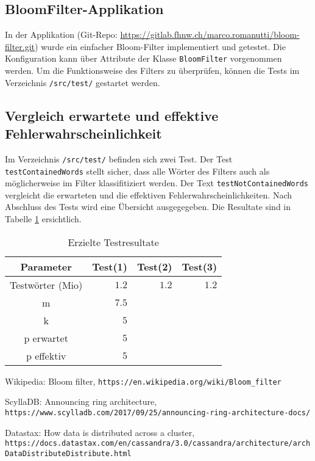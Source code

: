 \documentclass[10pt, a4paper, twocolumn]{article} %
\begin{document}
\subsection{BloomFilter-Applikation}

In der Applikation (Git-Repo: \url{https://gitlab.fhnw.ch/marco.romanutti/bloom-filter.git}) wurde ein einfacher Bloom-Filter implementiert und getestet.
Die Konfiguration kann über Attribute der Klasse \texttt{BloomFilter} vorgenommen werden.
Um die Funktionsweise des Filters zu überprüfen, können die Tests im Verzeichnis \texttt{/src/test/} gestartet werden.

\subsection{Vergleich erwartete und effektive Fehlerwahrscheinlichkeit}

Im Verzeichnis \texttt{/src/test/} befinden sich zwei Test.
Der Test \texttt{testContainedWords} stellt sicher, dass alle Wörter des Filters auch als möglicherweise im Filter klassifitiziert werden.
Der Text \texttt{testNotContainedWords} vergleicht die erwarteten und die effektiven Fehlerwahrscheinlichkeiten.
Nach Abschluss des Tests wird eine Übersicht ausgegegeben.
Die Resultate sind in Tabelle \ref{tests} ersichtlich.

\begin{table}[h]
	\caption{Erzielte Testresultate}
	\label{tests}
	\centering
	\begin{tabular}{crrr}
		\toprule
		\cmidrule(r){1-2}
		Parameter & Test(1) & Test(2) & Test(3) \\
		\midrule
		Testwörter (Mio) & $1.2$ & $1.2$ & $1.2$ \\
		m & $7.5$ & \\
		k & $5$ & \\
		p erwartet & $5$ & \\
		p effektiv & $5$ & \\
		\bottomrule
	\end{tabular}
\end{table}


\begin{thebibliography}{9}
	Wikipedia: Bloom filter,
	\texttt{https://en.wikipedia.org/wiki/Bloom\_filter}

	ScyllaDB: Announcing ring architecture,
	\texttt{https://www.scylladb.com/2017/09/25/announcing-ring-architecture-docs/}

	Datastax: How data is distributed across a cluster,
	\texttt{https://docs.datastax.com/en/cassandra/3.0/cassandra/architecture/archDataDistributeDistribute.html}
\end{thebibliography}
\end{document}

